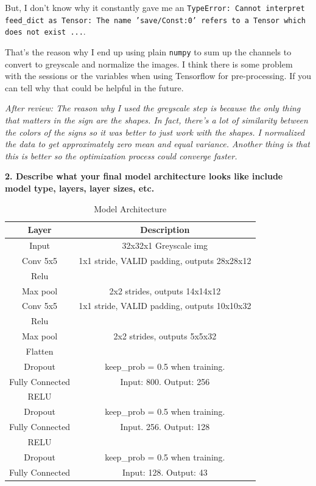 \documentclass[11pt, a4paper]{article}
\begin{document}
But, I don't know why it constantly gave me an \texttt{TypeError: Cannot interpret feed\_dict as Tensor: The name 'save/Const:0' refers to a Tensor which does not exist ...}.

That's the reason why I end up using plain \texttt{numpy} to sum up the channels to convert to greyscale and normalize the images. I think there is some problem with the sessions or the variables when using Tensorflow for pre-processing. If you can tell why that could be helpful in the future.


\textit{After review: The reason why I used the greyscale step is because the only thing that matters in the sign are the shapes. In fact, there's a lot of similarity between the colors of the signs so it was better to just work with the shapes. I normalized the data to get approximately zero mean and equal variance. Another thing is that this is better so the optimization process could converge faster.}



\textbf{2. Describe what your final model architecture looks like include model type, layers, layer sizes, etc.}




\begin{table}[htpb!]
	\centering
	\caption{Model Architecture}
	\label{tab:model_arc}
	\begin{tabular}{|c|c|}
	\hline
	 Layer		& Description \\
	 \hline
	 \hline
	 Input		& 32x32x1 Greyscale img \\
	 \hline
	 Conv 5x5	& 1x1 stride, VALID padding, outputs 28x28x12 \\ 	
	 \hline
	 Relu		& \\
	 \hline
	 Max pool	& 2x2 strides, outputs 14x14x12 \\
	 \hline
	 Conv 5x5	& 1x1 stride, VALID padding, outputs 10x10x32 \\
	 \hline
	 Relu		& \\
	 \hline
	 Max pool & 2x2 strides, outputs 5x5x32 \\
	 \hline
	 Flatten	& \\
	 \hline
	 Dropout	& keep\_prob = 0.5 when training. \\
	 \hline
	 Fully Connected & Input: 800. Output: 256 \\
	 \hline
	 RELU		& \\
	 \hline
	 Dropout	& keep\_prob = 0.5 when training. \\
	 \hline
	 Fully Connected & Input. 256. Output: 128 \\
	 \hline
	 RELU & \\
	 \hline
	 Dropout	& keep\_prob = 0.5 when training. \\
	 \hline
	 Fully Connected & Input: 128. Output: 43 \\
	 \hline
	 \hline

	\end{tabular}
\end{table}
\end{document}
